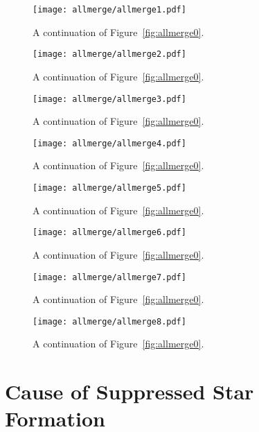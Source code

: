 \documentclass[linenumbers, twocolumn]{aastex631}
\begin{document}
\begin{figure*}
  \centering
  \texttt{[image: allmerge/allmerge1.pdf]}
  \caption{A continuation of Figure~\ref{fig:allmerge0}.}
  \label{fig:allmerge1}
\end{figure*}

\begin{figure*}
  \centering
  \texttt{[image: allmerge/allmerge2.pdf]}
  \caption{A continuation of Figure~\ref{fig:allmerge0}.}
  \label{fig:allmerge2}
\end{figure*}

\begin{figure*}
  \centering
  \texttt{[image: allmerge/allmerge3.pdf]}
  \caption{A continuation of Figure~\ref{fig:allmerge0}.}
  \label{fig:allmerge3}
\end{figure*}

\begin{figure*}
  \centering
  \texttt{[image: allmerge/allmerge4.pdf]}
  \caption{A continuation of Figure~\ref{fig:allmerge0}.}
  \label{fig:allmerge4}
\end{figure*}

\begin{figure*}
  \centering
  \texttt{[image: allmerge/allmerge5.pdf]}
  \caption{A continuation of Figure~\ref{fig:allmerge0}.}
  \label{fig:allmerge5}
\end{figure*}

\begin{figure*}
  \centering
  \texttt{[image: allmerge/allmerge6.pdf]}
  \caption{A continuation of Figure~\ref{fig:allmerge0}.}
  \label{fig:allmerge6}
\end{figure*}

\begin{figure*}
  \centering
  \texttt{[image: allmerge/allmerge7.pdf]}
  \caption{A continuation of Figure~\ref{fig:allmerge0}.}
  \label{fig:allmerge7}
\end{figure*}

\begin{figure*}
  \centering
  \texttt{[image: allmerge/allmerge8.pdf]}
  \caption{A continuation of Figure~\ref{fig:allmerge0}.}
  \label{fig:allmerge8}
\end{figure*}

\section{Cause of Suppressed Star Formation}\label{app:cause_qui}
\end{document}

